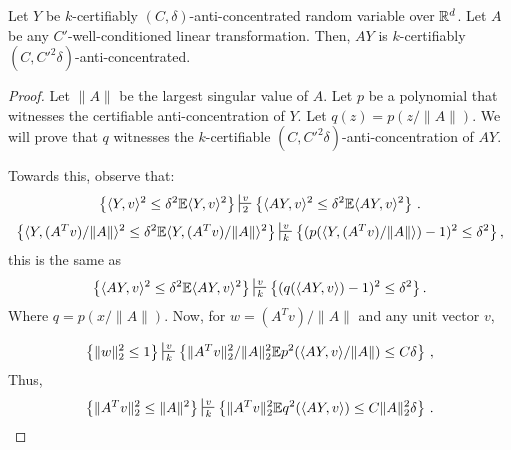 \begin{lemma}\label{lem:linear-transformations-anti-concentration}
Let $Y$ be $k$-certifiably $(C,\delta)$-anti-concentrated random variable over $\mathbb R^d$.
Let $A$ be any $C'$-well-conditioned linear transformation.
Then, $AY$ is $k$-certifiably $(C,C'^2\delta)$-anti-concentrated.
\end{lemma}
\begin{proof} 
Let $\|A\|$ be the largest singular value of $A$.
Let $p$ be a polynomial that witnesses the certifiable anti-concentration of $Y$.
Let $q(z) = p(z/\|A\|)$.
We will prove that $q$ witnesses the $k$-certifiable $(C,C'^2 \delta)$-anti-concentration of $AY$.

Towards this, observe that:
\[
\Set{\iprod{Y,v}^2 \leq \delta^2 \E \iprod{Y, v}^2} \sststile{2}{v} \Set{\iprod{AY,v}^2 \leq \delta^2 \E \iprod{AY,v}^2}\mper
\]
\[ \left \{ \langle Y,(A^Tv)/\|A\| \rangle^2 \leq \delta^2 \E \langle Y,(A^Tv)/\|A\| \rangle^2 \right \}  \sststile{k}{v} \left \{ (p(\langle Y,(A^Tv)/\|A\| \rangle) -1)^2\leq \delta^2 \right \}, \]
this is the same as 
\[ \left \{ \langle AY,v\rangle^2 \leq \delta^2 \E \langle AY,v\rangle^2 \right \}  \sststile{k}{v} \left \{ (q(\langle AY,v\rangle) -1)^2\leq \delta^2 \right \}. \]
Where $q = p(x/\|A\|)$. Now, for $w = (A^Tv)/\|A\|$ and any unit vector $v$,

\[ \left \{ \|w\|_2^2 \leq 1 \right \} \sststile{k}{v} \left \{ \|A^Tv\|_2^2 / \|A\|_2^2 \E p^2(\left \langle AY,v\rangle/\|A\| \right) \leq C\delta \right \} \mcom\]
Thus, 
\[ \left \{ \|A^Tv\|_2^2 \leq \|A\|^2 \right \} \sststile{k}{v} \left \{ \|A^Tv\|_2^2\E q^2(\left \langle AY,v\rangle \right) \leq C \|A\|_2^2 \delta \right \} \mper\]


\end{proof}
